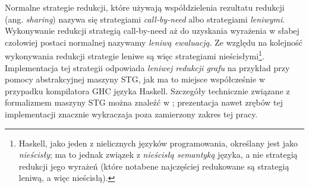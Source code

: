 Normalne strategie redukcji, które używają współdzielenia rezultatu redukcji (ang. \emph{sharing}) nazywa się strategiami \emph{call-by-need} albo strategiami \emph{leniwymi}. Wykonywanie redukcji strategią call-by-need aż do uzyskania wyrażenia w słabej czołowiej postaci normalnej nazywamy \emph{leniwą ewaluacją}. Ze względu na kolejność wykonywania redukcji strategie leniwe są więc strategiami nieścisłymi\footnote{Haskell, jako jeden z nielicznych języków programowania, określany jest jako \emph{nieścisły}; ma to jednak związek z \emph{nieścisłą semantyką} języka, a nie strategią redukcji jego wyrażeń (które notabene najczęściej redukowane są strategią leniwą, a więc nieścisłą).}. Implementacja tej strategii odpowiada \emph{leniwej redukcji grafu} \cite[Rozdział 12.1, str. 212]{PeytonJones:1987:IFP:1096899} na przykład przy pomocy abstrakcyjnej maszyny STG, jak ma to miejsce współcześnie w przypadku kompilatora GHC języka Haskell. Szczegóły technicznie związane z formalizmem maszyny STG można znaleźć w \cite{jones1992implementing}; prezentacja nawet zrębów tej implementacji znacznie wykraczaja poza zamierzony zakres tej pracy. 

